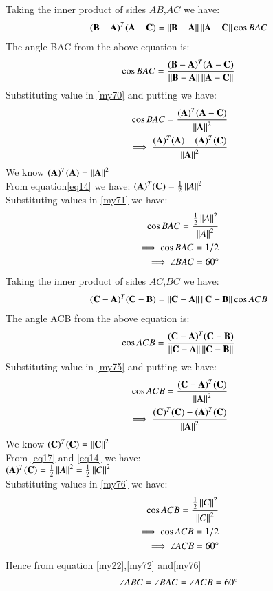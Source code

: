 \documentclass[journal,12pt,twocolumn]{IEEEtran}
\begin{document}
Taking the inner product of sides $AB$,$AC$ we have:
\begin{align}
    (\mathbf{B}-\mathbf{A})^T(\mathbf{A}-\mathbf{C}) =
    \left\lVert\mathbf{B}-\mathbf{A}\right\rVert\left\lVert\mathbf{A}-\mathbf{C}\right\rVert\cos{BAC}
\end{align}
The angle BAC from the  above equation is:
\begin{align}\label{my70}
     \cos{BAC} = \frac{(\mathbf{B}-\mathbf{A})^T(\mathbf{A}-\mathbf{C})}{\left\lVert\mathbf{B}-\mathbf{A}\right\rVert\left\lVert\mathbf{A}-\mathbf{C}\right\rVert} 
\end{align}
Substituting value in \ref{my70} and putting we have:
\begin{align}\label{my71}
     \cos{BAC} = \frac{(\mathbf{A})^T(\mathbf{A-C})}{\left\lVert\mathbf{A}\right\rVert^2}\\
     \implies \frac{(\mathbf{A})^T(\mathbf{A})-(\mathbf{A})^T(\mathbf{C})}{\left\lVert\mathbf{A}\right\rVert^2}
\end{align}
We know $(\mathbf{A})^T (\mathbf{A})= {\left\lVert\mathbf{A}\right\rVert^2}$\\
From  equation\ref{eq14} we have:
$ (\mathbf{A})^T(\mathbf{C})= \frac{1}{2}\left\lVert A\right\rVert^2$\\
Substituting values in \ref{my71} we have:
\begin{align}\label{my72}
\cos{BAC} =
    \frac{{\frac{1}{2}\left\lVert A\right\rVert^2}}{\left\lVert A\right\rVert^2}\nonumber\\
     \implies \cos{BAC} = 1/2\nonumber\\
\implies \angle {BAC =60 \degree}
\end{align}
Taking the inner product of sides $AC$,$BC$ we have:
\begin{align}
    (\mathbf{C}-\mathbf{A})^T(\mathbf{C}-\mathbf{B}) =
    \left\lVert\mathbf{C}-\mathbf{A}\right\rVert\left\lVert\mathbf{C}-\mathbf{B}\right\rVert\cos{ACB}
\end{align}
The angle ACB from the  above equation is:
\begin{align}\label{my75}
     \cos{ACB} = \frac{(\mathbf{C}-\mathbf{A})^T(\mathbf{C}-\mathbf{B})}{\left\lVert\mathbf{C}-\mathbf{A}\right\rVert\left\lVert\mathbf{C}-\mathbf{B}\right\rVert} 
\end{align}
Substituting value in \ref{my75} and putting we have:
\begin{align}\label{my76}
     \cos{ACB} = \frac{(\mathbf{C-A})^T(\mathbf{C})}{\left\lVert\mathbf{A}\right\rVert^2}\nonumber\\
     \implies \frac{(\mathbf{C})^T(\mathbf{C})-(\mathbf{A})^T(\mathbf{C})}{\left\lVert\mathbf{A}\right\rVert^2}
\end{align}
We know $(\mathbf{C})^T (\mathbf{C})= {\left\lVert\mathbf{C}\right\rVert^2}$\\
From   \ref{eq17}  and \ref{eq14}  we have:\\
$(\mathbf{A})^T(\mathbf{C})= \frac{1}{2}\left\lVert A\right\rVert^2=\frac{1}{2}\left\lVert C\right\rVert^2$\\
Substituting values in \ref{my76} we have:
\begin{align}\label{my75}
\cos {ACB}=
     \frac{{\frac{1}{2}\left\lVert C\right\rVert^2}}{\left\lVert C\right\rVert^2}\nonumber\\
     \implies \cos{ACB} = 1/2\nonumber\\
\implies \angle {ACB = 60} \degree
\end{align}
Hence from  equation \ref{my22},\ref{my72} and\ref{my76}
\begin{align}
\angle {ABC} =\angle {BAC}=\angle {ACB}=60\degree
    \end{align}
\end{document}
